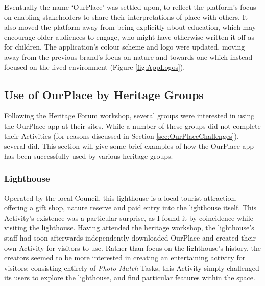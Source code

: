 Eventually the name `OurPlace' was settled upon, to reflect the platform's focus on enabling stakeholders to share their interpretations of place with others. It also moved the platform away from being explicitly about education, which may encourage older audiences to engage, who might have otherwise written it off as for children. The application's colour scheme and logo were updated, moving away from the previous brand's focus on nature and towards one which instead focused on the lived environment (Figure \ref{fig:AppLogos}).

\subsection{Use of OurPlace by Heritage Groups}

Following the Heritage Forum workshop, several groups were interested in using the OurPlace app at their sites. While a number of these groups did not complete their Activities (for reasons discussed in Section \ref{sec:OurPlaceChallenges}), several did. This section will give some brief examples of how the OurPlace app has been successfully used by various heritage groups.

\subsubsection{Lighthouse}

Operated by the local Council, this lighthouse is a local tourist attraction, offering a gift shop, nature reserve and paid entry into the lighthouse itself. This Activity's existence was a particular surprise, as I found it by coincidence while visiting the lighthouse. Having attended the heritage workshop, the lighthouse's staff had soon afterwards independently downloaded OurPlace and created their own Activity for visitors to use. Rather than focus on the lighthouse's history, the creators seemed to be more interested in creating an entertaining activity for visitors: consisting entirely of \textit{Photo Match} Tasks, this Activity simply challenged its users to explore the lighthouse, and find particular features within the space.

